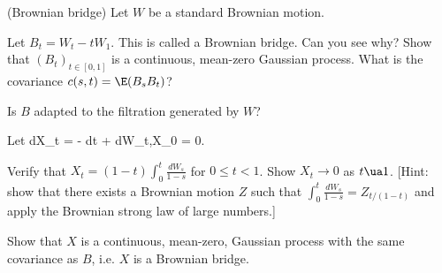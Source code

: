 
\item (Brownian bridge) Let $W$ be a standard Brownian motion.
\ben
\item [(a)] Let $B_t = W_t - tW_1$. This is called a Brownian bridge. Can you see why? Show that $(B_t)_{t\in[0,1]}$ is a continuous, mean-zero Gaussian process. What is the covariance $c(s, t) = \E(B_sB_t)$?
\item [(b)] Is $B$ adapted to the filtration generated by $W$?
\item [(c)] Let 
\be
dX_t = - dt + dW_t,\quad X_0 = 0.
\ee

Verify that $X_t = (1 - t) \int^t_0 \frac{dW_s}{1-s}$ for $0 \leq t < 1$. Show $X_t \to 0$ as $t \ua 1$. [Hint: show that there
exists a Brownian motion $Z$ such that $\int^t_0 \frac{dW_s}{1-s} = Z_{t/(1-t)}$ and apply the Brownian strong law of large numbers.]

\item [(d)] Show that $X$ is a continuous, mean-zero, Gaussian process with the same covariance as $B$, i.e. $X$ is a Brownian bridge.
\een

